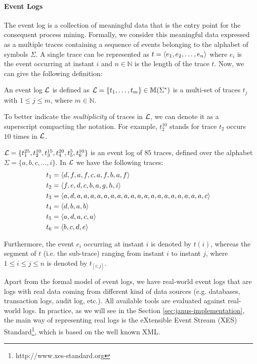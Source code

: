 \paragraph{Event Logs}
The event log is a collection of meaningful data that is the entry point for the consequent process mining. Formally, we consider this meaningful data expressed as a multiple traces containing a sequence of events belonging to the alphabet of symbols $\Sigma$. A single trace can be represented as $t = \langle e_1,e_2,\dots,e_n \rangle$ where $e_i$ is the event occurring at instant $i$ and $n \in \mathbb{N}$ is the length of the trace $t$.  Now, we can give the following definition:
\begin{definition}
An event log $\mathcal{L}$ is defined as $\mathcal{L} = \{t_1,\dots,t_m\} \in \mathbb{M} (\Sigma^*)$ is a multi-set of traces $t_j$ with $1 \le j \le m$, where $m \in \mathbb{N}$.
\end{definition}
To better indicate the \textit{multiplicity} of traces in $\mathcal{L}$, we can denote it as a superscript compacting the notation. For example, $t_{2}^{10}$ stands for trace $t_2$ occurs $10$ times in $\mathcal{L}$.
\begin{example}\label{ex:traces}
$\mathcal{L} = \{t_{1}^{25},t_{2}^{10},t_{3}^{15},t_{4}^{20},t_{5}^{5},t_{6}^{10}\}$ is an event log of $85$ traces, defined over the alphabet $\Sigma = \{a,b,c,\dots, i \} $. In $ \mathcal{L} $ we have the following traces:
\begin{align*}
t_1 &= \langle d,f,a,f,c,a,f,b,a,f \rangle\\
t_2 &= \langle f,e,d,c,b,a,g,h,i \rangle\\
t_3 &= \langle a,d,a,a,a,a,a,a,a,a,a,a,a,a,a,a,a,a,a,a,a,c \rangle\\
t_4 &= \langle d,b,a,b \rangle\\
t_5 &= \langle a,d,a,c,a \rangle\\
t_6 &= \langle b,c,d,e \rangle
\end{align*}
\end{example}
Furthermore, the event $e_i$ occurring at instant $i$ is denoted by $t(i)$, whereas the segment of $t$ (i.e. the sub-trace) ranging from instant $i$ to instant $j$, where $1 \le i \le j \le n$ is denoted by $t_{[i:j]}$.

Apart from the formal model of event logs, we have real-world event logs that are logs with real data coming from different kind of data sources (e.g. databases, transaction logs, audit log, etc.). All available tools are evaluated against real-world logs. In practice, as we will see in the Section \ref{sec:janus-implementation}, the main way of representing real logs is the eXtensible Event Stream (XES) Standard\footnote{http://www.xes-standard.org}, which is based on the well known XML.
